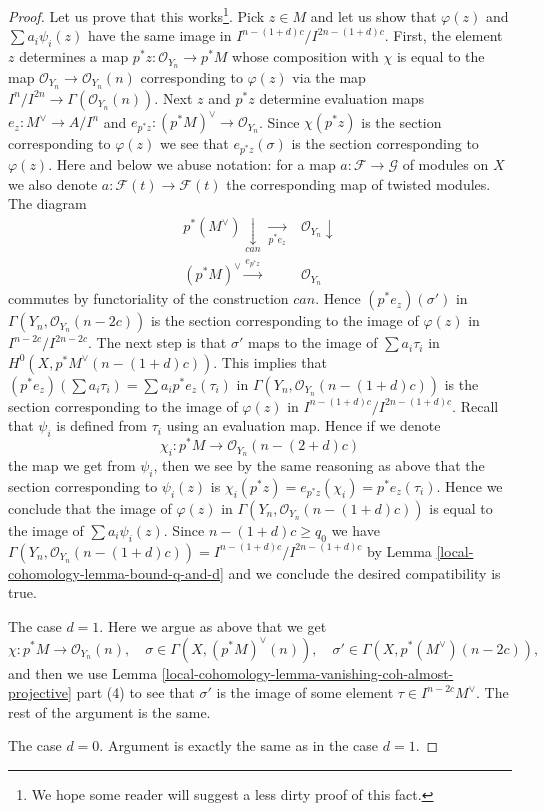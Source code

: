 \begin{proof}
\medskip\noindent
Let us prove that this works\footnote{We hope some reader will suggest
a less dirty proof of this fact.}. Pick $z \in M$ and let us show that
$\varphi(z)$ and $\sum a_i \psi_i(z)$ have the same image in
$I^{n - (1 + d)c}/I^{2n - (1 + d)c}$.
First, the element $z$ determines a map
$p^*z : \mathcal{O}_{Y_n} \to p^*M$ whose composition with
$\chi$ is equal to the map $\mathcal{O}_{Y_n} \to \mathcal{O}_{Y_n}(n)$
corresponding to $\varphi(z)$ via the map
$I^n/I^{2n} \to \Gamma(\mathcal{O}_{Y_n}(n))$.
Next $z$ and $p^*z$ determine evaluation maps
$e_z : M^\vee \to A/I^n$ and $e_{p^*z} : (p^*M)^\vee \to \mathcal{O}_{Y_n}$.
Since $\chi(p^*z)$ is the section corresponding to $\varphi(z)$
we see that $e_{p^*z}(\sigma)$ is the section corresponding to $\varphi(z)$.
Here and below we abuse notation: for a map
$a : \mathcal{F} \to \mathcal{G}$ of modules on $X$
we also denote $a : \mathcal{F}(t) \to \mathcal{F}(t)$ the corresponding
map of twisted modules. The diagram
$$
\begin{array}{cc}p^*(M^\vee) \underset{can}{\downarrow}\underset{p^*e_z}{\longrightarrow} & \mathcal{O}_{Y_n} \downarrow \\ (p^*M)^\vee \overset{e_{p^*z}}{\longrightarrow} & \mathcal{O}_{Y_n}\end{array}
$$
commutes by functoriality of the construction $can$. Hence
$(p^*e_z)(\sigma')$ in $\Gamma(Y_n, \mathcal{O}_{Y_n}(n - 2c))$
is the section corresponding to the image of $\varphi(z)$
in $I^{n - 2c}/I^{2n - 2c}$.
The next step is that $\sigma'$ maps to the image
of $\sum a_i \tau_i$ in $H^0(X, p^*M^\vee(n - (1 + d)c))$.
This implies that $(p^*e_z)(\sum a_i \tau_i) = \sum a_i p^*e_z(\tau_i)$
in $\Gamma(Y_n, \mathcal{O}_{Y_n}(n - (1 + d)c))$ is the section corresponding
to the image of $\varphi(z)$ in $I^{n - (1 + d)c}/I^{2n - (1 + d)c}$.
Recall that $\psi_i$ is defined from $\tau_i$ using an evaluation
map. Hence if we denote
$$
\chi_i : p^*M \longrightarrow \mathcal{O}_{Y_n}(n - (2 + d)c)
$$
the map we get from $\psi_i$, then we see by the same reasoning
as above that the section corresponding to $\psi_i(z)$ is
$\chi_i(p^*z) = e_{p^*z}(\chi_i) = p^*e_z(\tau_i)$. Hence we conclude that
the image of $\varphi(z)$ in $\Gamma(Y_n, \mathcal{O}_{Y_n}(n - (1 + d)c))$
is equal to the image of $\sum a_i\psi_i(z)$.
Since $n - (1 + d)c \geq q_0$ we have
$\Gamma(Y_n, \mathcal{O}_{Y_n}(n - (1 + d)c)) =
I^{n - (1 + d)c}/I^{2n - (1 + d)c}$ by Lemma \ref{local-cohomology-lemma-bound-q-and-d} and
we conclude the desired compatibility is true.

\medskip\noindent
The case $d = 1$. Here we argue as above that we get
$$
\chi : p^*M \longrightarrow \mathcal{O}_{Y_n}(n),\quad
\sigma \in \Gamma(X, (p^*M)^\vee(n)),\quad
\sigma' \in \Gamma(X, p^*(M^\vee)(n - 2c)),
$$
and then we use
Lemma \ref{local-cohomology-lemma-vanishing-coh-almost-projective} part (4)
to see that $\sigma'$ is the image of some element
$\tau \in I^{n - 2c}M^\vee$. The rest of the argument is the same.

\medskip\noindent
The case $d = 0$. Argument is exactly the same as in the
case $d = 1$.
\end{proof}

